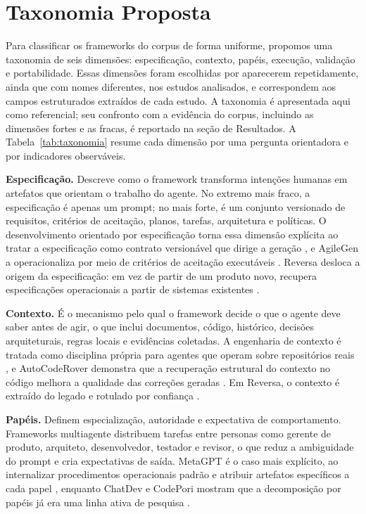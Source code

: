 \section{Taxonomia Proposta}

Para classificar os frameworks do corpus de forma uniforme, propomos uma taxonomia de seis dimensões: especificação, contexto, papéis, execução, validação e portabilidade. Essas dimensões foram escolhidas por aparecerem repetidamente, ainda que com nomes diferentes, nos estudos analisados, e correspondem aos campos estruturados extraídos de cada estudo. A taxonomia é apresentada aqui como referencial; seu confronto com a evidência do corpus, incluindo as dimensões fortes e as fracas, é reportado na seção de Resultados. A Tabela~\ref{tab:taxonomia} resume cada dimensão por uma pergunta orientadora e por indicadores observáveis.

\noindent\textbf{Especificação.} Descreve como o framework transforma intenções humanas em artefatos que orientam o trabalho do agente. No extremo mais fraco, a especificação é apenas um prompt; no mais forte, é um conjunto versionado de requisitos, critérios de aceitação, planos, tarefas, arquitetura e políticas. O desenvolvimento orientado por especificação torna essa dimensão explícita ao tratar a especificação como contrato versionável que dirige a geração \cite{DeepakBabuPiskala2026}, e AgileGen a operacionaliza por meio de critérios de aceitação executáveis \cite{SaiZhang2025}. Reversa desloca a origem da especificação: em vez de partir de um produto novo, recupera especificações operacionais a partir de sistemas existentes \cite{Macedo2026}.

\noindent\textbf{Contexto.} É o mecanismo pelo qual o framework decide o que o agente deve saber antes de agir, o que inclui documentos, código, histórico, decisões arquiteturais, regras locais e evidências coletadas. A engenharia de contexto é tratada como disciplina própria para agentes que operam sobre repositórios reais \cite{SeyedmoeinMohsenimofidi2025}, e AutoCodeRover demonstra que a recuperação estrutural do contexto no código melhora a qualidade das correções geradas \cite{YuntongZhang2024}. Em Reversa, o contexto é extraído do legado e rotulado por confiança \cite{Macedo2026}.

\noindent\textbf{Papéis.} Definem especialização, autoridade e expectativa de comportamento. Frameworks multiagente distribuem tarefas entre personas como gerente de produto, arquiteto, desenvolvedor, testador e revisor, o que reduz a ambiguidade do prompt e cria expectativas de saída. MetaGPT é o caso mais explícito, ao internalizar procedimentos operacionais padrão e atribuir artefatos específicos a cada papel \cite{SiruiHong2023}, enquanto ChatDev e CodePori mostram que a decomposição por papéis já era uma linha ativa de pesquisa \cite{ChenQian2023,ZeeshanRasheed2024}.

